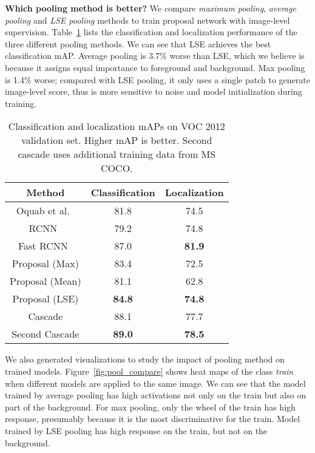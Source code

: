 \documentclass[10pt,twocolumn,letterpaper]{article}
\begin{document}
\textbf{Which pooling method is better?} We compare \textit{maximum pooling}, \textit{average pooling} and \textit{LSE pooling} methods to train proposal network with image-level supervision. Table~\ref{tab:voc12_val} lists the classification and localization performance of the three different pooling methods. We can see that LSE achieves the best classification mAP. Average pooling is 3.7\% worse than LSE, which we believe is because it assigns equal importance to foreground and background. Max pooling is 1.4\% worse; compared with LSE pooling, it only uses a single patch to generate image-level score, thus is more sensitive to noise and model initialization during training.

\begin{table}
\small
\center
\begin{tabular}{ccc}
\hline
Method & Classification & Localization\\
\hline
\rowcolor{gray!30}Oquab et al.~\cite{Oquab_2015_CVPR} & 81.8 & 74.5\\
RCNN~\cite{DBLP:journals/corr/GirshickDDM13} & 79.2 & 74.8\\
\rowcolor{gray!30}Fast RCNN~\cite{DBLP:journals/corr/Girshick15} & 87.0 & \textbf{81.9}\\
\hline
\hline
Proposal (Max) & 83.4 & 72.5\\
\rowcolor{gray!30}Proposal (Mean) & 81.1 & 62.8\\
Proposal (LSE) & \textbf{84.8} & \textbf{74.8}\\
\hline\hline
\rowcolor{gray!30}Cascade & 88.1 & 77.7\\
Second Cascade & \textbf{89.0} & \textbf{78.5}\\
\hline
\end{tabular}
\caption{Classification and localization mAPs on VOC 2012 validation set.  Higher mAP is better. Second cascade uses additional training data from MS COCO.}
\label{tab:voc12_val}
\end{table}


We also generated visualizations to study the impact of pooling method on trained models. Figure~\ref{fig:pool_compare} shows heat maps of the class \textit{train} when different models are applied to the same image. We can see that the model trained by average pooling has high activations not only on the train but also on part of the background. For max pooling, only the wheel of the train has high response, presumably because it is the most discriminative for the train. Model trained by LSE pooling has high response on the train, but not on the background.
\end{document}
